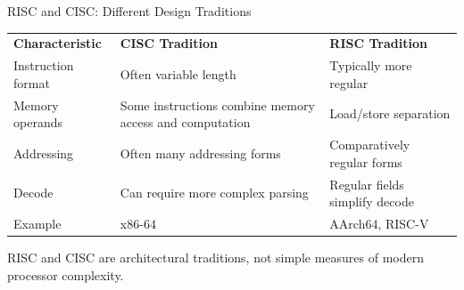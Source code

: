 \documentclass[aspectratio=169,11pt,t]{beamer}
\begin{document}
\begin{frame}{RISC and CISC: Different Design Traditions}

\small

\begin{center}

\renewcommand{\arraystretch}{1.05}

\begin{tabular}{
  >{\raggedright\arraybackslash}m{3.0cm}
  >{\raggedright\arraybackslash}m{4.2cm}
  >{\raggedright\arraybackslash}m{4.2cm}
}

\rowcolor{navy}
{\color{white}\bfseries Characteristic}
&
{\color{white}\bfseries CISC Tradition}
&
{\color{white}\bfseries RISC Tradition}
\\

\rowcolor{softgray}
Instruction format
&
Often variable length
&
Typically more regular
\\

\rowcolor{white}
Memory operands
&
Some instructions combine memory access and computation
&
Load/store separation
\\

\rowcolor{softgray}
Addressing
&
Often many addressing forms
&
Comparatively regular forms
\\

\rowcolor{white}
Decode
&
Can require more complex parsing
&
Regular fields simplify decode
\\

\rowcolor{softgray}
Example
&
x86-64
&
AArch64, RISC-V
\\

\end{tabular}

\end{center}

\vspace{0.1cm}

RISC and CISC are architectural traditions,
not simple measures of modern processor complexity.

\end{frame}



\end{document}
